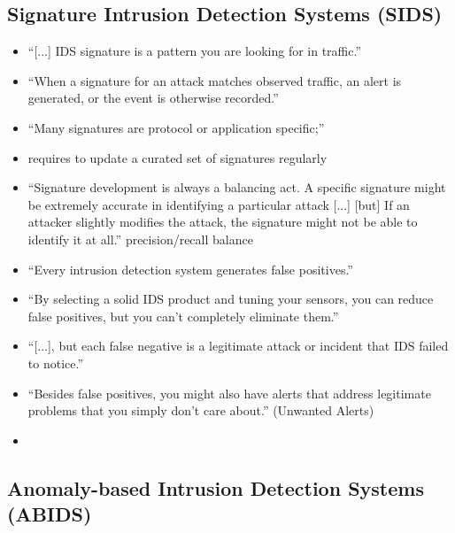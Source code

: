 	\subsection{Signature Intrusion Detection Systems (SIDS)}
	\label{sec:background:network:ids:sig}
	
		\begin{itemize}
			\item \enquote{[...] IDS signature is a pattern you are looking for in traffic.} \parencite{Northcutt2005}
			\item \enquote{When a signature for an attack matches observed traffic, an alert is generated, or the event is otherwise recorded.} \parencite{Northcutt2005}
			\item \enquote{Many signatures are protocol or application specific;} \parencite{Northcutt2005}
			\item requires to update a curated set of signatures regularly \parencite{Northcutt2005}
			\item \enquote{Signature development is always a balancing act. A specific signature might be extremely accurate in identifying a particular attack [...] [but] If an attacker slightly modifies the attack, the signature might not be able to identify it at all.} \parencite{Northcutt2005}
				\subitem precision/recall balance
			\item \enquote{Every intrusion detection system generates false positives.} \parencite[p.~205]{Northcutt2005}
			\item \enquote{By selecting a solid IDS product and tuning your sensors, you can reduce false positives, but you can't completely eliminate them.} \parencite[p.~205]{Northcutt2005}
			\item \enquote{[...], but each false negative is a legitimate attack or incident that IDS failed to notice.} \parencite[p.~206]{Northcutt2005}
			\item \enquote{Besides false positives, you might also have alerts that address legitimate problems that you simply don't care about.} (Unwanted Alerts) \parencite[p.~206]{Northcutt2005}
			\item 
		\end{itemize} 
	
	\subsection{Anomaly-based Intrusion Detection Systems (ABIDS)}
	\label{sec:background:network:ids:anomaly}
	
